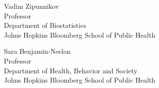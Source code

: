 \begin{singlespace}


\indent Vadim Zipunnikov  \\
\indent \indent Professor\\
\indent \indent Department of Biostatistics\\
\indent \indent  Johns Hopkins Bloomberg School of Public Health \\


\smallskip

\noindent Sara Benjamin-Neelon  \\
\indent \indent Professor\\
\indent \indent Department of Health, Behavior and Society\\
\indent \indent  Johns Hopkins Bloomberg School of Public Health \\

\end{singlespace}















